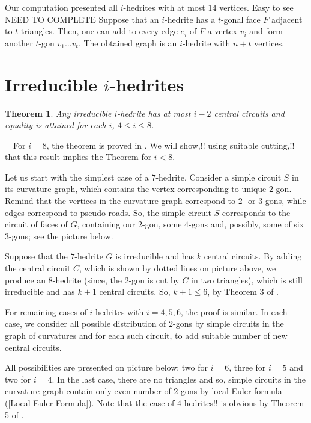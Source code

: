 \documentclass[12pt]{article}
\newtheorem{theor}{Theorem}
\newcommand{\proof}{\noindent{\bf Proof.}\ \ }
\begin{document}
Our computation presented all $i$-hedrites with at most $14$ vertices. Easy to see NEED TO COMPLETE
Suppose that an $i$-hedrite has a $t$-gonal face $F$ adjacent to $t$ triangles. Then, one can add to every edge $e_i$ of $F$ a vertex $v_i$ and form another $t$-gon $v_1\dots v_t$. The obtained graph is an $i$-hedrite with $n+t$ vertices.




\section{Irreducible $i$-hedrites}



\begin{theor}\label{irre}
Any irreducible $i$-hedrite has at most $i-2$ central circuits and equality is attained for each $i$, $4\leq i\leq 8$.
\end{theor}
\proof For $i=8$, the theorem is proved in \cite{DSt}. We will 
show,!! using suitable cutting,!! that this result implies the Theorem for $i<8$.

Let us start with the simplest case of a $7$-hedrite. Consider a simple circuit $S$ in its curvature graph, which contains the vertex corresponding to unique $2$-gon. Remind that the vertices in the curvature graph correspond to $2$- or $3$-gons, while edges correspond to pseudo-roads. So, the simple circuit $S$ corresponds to the circuit of faces of $G$, containing our $2$-gon, some $4$-gons and, possibly, some of six $3$-gons; see the picture below.


\begin{center}
\epsfxsize=40mm
\end{center}






Suppose that the $7$-hedrite $G$ is irreducible and has $k$ central circuits. By adding the central circuit $C$, which is shown by dotted lines on picture above, we produce an $8$-hedrite (since, the $2$-gon is cut by $C$ in two triangles), which is still irreducible and has $k+1$ central circuits. So, $k+1\leq 6$, by Theorem 3 of \cite{DSt}.


For remaining cases of $i$-hedrites with $i=4,5,6$, the proof is similar. In each case, we consider all possible distribution of $2$-gons by simple circuits in the graph of curvatures and for each such circuit, to add suitable number of new central circuits. 


All possibilities are presented on picture below: two for $i=6$, three for $i=5$ and two for $i=4$. In the last case, there are no triangles and so, simple circuits in the curvature graph contain only even number of $2$-gons by local Euler formula (\ref{Local-Euler-Formula}). Note that the case of 
$4$-hedrites!! is obvious by Theorem 5 of \cite{DSt}.
\end{document}
